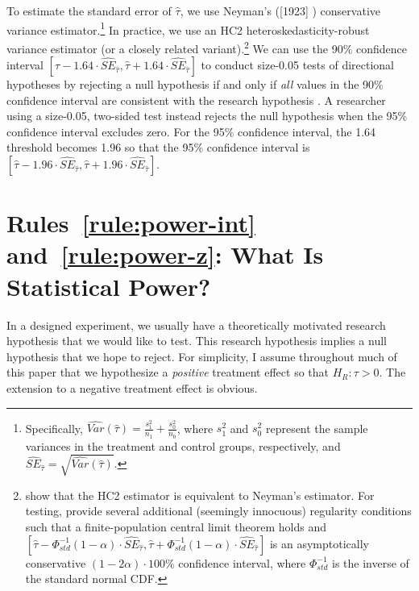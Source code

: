 \documentclass[12pt]{article}
\begin{document}
To estimate the standard error of $\widehat{\tau}$, we use Neyman's ([1923] \citeyear{Neyman1923}) conservative variance estimator.\footnote{
  Specifically, $\widehat{Var}\left( \widehat{\tau} \right) = \frac{s_{1}^{2}}{n_{1}} + \frac{s_{0}^{2}}{n_{0}}$, where $s_{1}^{2}$ and $s_{0}^{2}$ represent the sample variances in the treatment and control groups, respectively, and ${\widehat{SE}}_{\widehat{\tau}} = \sqrt{\widehat{Var}\left( \widehat{\tau} \right)}$.
  }
In practice, we use an HC2 heteroskedasticity-robust variance estimator (or a closely related variant).\footnote{
  \citet[367--368]{Samii2012} show that the HC2 estimator is equivalent to Neyman's estimator. For testing, \citet[1764--1765]{Li2017} provide several additional (seemingly innocuous) regularity conditions such that a finite-population central limit theorem holds and $\left\lbrack \widehat{\tau} - \Phi_{std}^{-1}\left( 1 - \alpha \right) \cdot {\widehat{SE}}_{\widehat{\tau}},\widehat{\tau} + \Phi_{std}^{-1}\left( 1 - \alpha \right) \cdot {\widehat{SE}}_{\widehat{\tau}} \right\rbrack$ is an asymptotically conservative $\left( 1 - 2\alpha \right) \cdot 100\%$ confidence interval, where $\Phi_{std}^{-1}$ is the inverse of the standard normal CDF.
  }
We can use the 90\% confidence interval $\left\lbrack \widehat{\tau} - 1.64 \cdot {\widehat{SE}}_{\widehat{\tau}},\widehat{\tau} + 1.64 \cdot {\widehat{SE}}_{\widehat{\tau}} \right\rbrack$ to conduct size-0.05 tests of directional hypotheses by rejecting a null hypothesis if and only if \emph{all} values in the 90\% confidence interval are consistent with the research hypothesis \citep{Rainey2014, McCaskey2015}.
A researcher using a size-0.05, two-sided test instead rejects the null hypothesis when the 95\% confidence interval excludes zero.
For the 95\% confidence interval, the 1.64 threshold becomes 1.96 so that the 95\% confidence interval is $\left\lbrack \widehat{\tau} - 1.96 \cdot {\widehat{SE}}_{\widehat{\tau}},\widehat{\tau} + 1.96 \cdot {\widehat{SE}}_{\widehat{\tau}} \right\rbrack$.

\section*{Rules~\ref{rule:power-int} and~\ref{rule:power-z}: What Is Statistical Power?}

In a designed experiment, we usually have a theoretically motivated research hypothesis that we would like to test.
This research hypothesis implies a null hypothesis that we hope to reject.
For simplicity, I assume throughout much of this paper that we hypothesize a \emph{positive} treatment effect so that $H_{R}:\tau > 0$.
The extension to a negative treatment effect is obvious.
\end{document}
